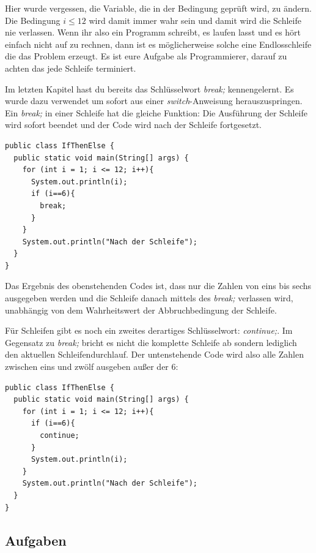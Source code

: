 Hier wurde vergessen, die Variable, die in der Bedingung geprüft wird, zu ändern. Die Bedingung \textit{$i\le 12$} wird damit immer wahr sein und damit wird die Schleife nie verlassen. Wenn ihr also ein Programm schreibt, es laufen lasst und es hört einfach nicht auf zu rechnen, dann ist es möglicherweise solche eine Endlosschleife die das Problem erzeugt. Es ist eure Aufgabe als Programmierer, darauf zu achten das jede Schleife terminiert.

Im letzten Kapitel hast du bereits das Schlüsselwort \textit{break;} kennengelernt. Es wurde dazu verwendet um sofort aus einer \textit{switch}-Anweisung herauszuspringen. Ein \textit{break;} in einer Schleife hat die gleiche Funktion: Die Ausführung der Schleife wird sofort beendet und der Code wird nach der Schleife fortgesetzt.

\begin{minipage}{\textwidth}
\begin{lstlisting}
public class IfThenElse {
  public static void main(String[] args) {
    for (int i = 1; i <= 12; i++){
      System.out.println(i);
      if (i==6){
        break;
      }
    }
    System.out.println("Nach der Schleife");
  }
}
\end{lstlisting}
\end{minipage}

Das Ergebnis des obenstehenden Codes ist, dass nur die Zahlen von eins bis sechs ausgegeben werden und die Schleife danach mittels des \textit{break;} verlassen wird, unabhängig von dem Wahrheitswert der Abbruchbedingung der Schleife. 

Für Schleifen gibt es noch ein zweites derartiges Schlüsselwort: \textit{continue;}. Im Gegensatz zu \textit{break;} bricht es nicht die komplette Schleife ab sondern lediglich den aktuellen Schleifendurchlauf. Der untenstehende Code wird also alle Zahlen zwischen eins und zwölf ausgeben außer der 6:

\begin{minipage}{\textwidth}
\begin{lstlisting}
public class IfThenElse {
  public static void main(String[] args) {
    for (int i = 1; i <= 12; i++){
      if (i==6){
        continue;
      }
      System.out.println(i);
    }
    System.out.println("Nach der Schleife");
  }
}
\end{lstlisting}
\end{minipage}

\subsection{Aufgaben}

